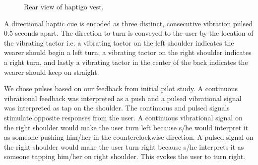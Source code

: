 \documentclass{sigchi}
\begin{document}
\begin{figure}
\centering
{}
\caption{Rear view of haptigo vest.}
\label{figure:haptigo:back}
\end{figure}

A directional haptic cue is encoded as three distinct, consecutive vibration pulsed 0.5 seconds apart. The direction to turn is conveyed to the user by the location of the vibrating tactor i.e. a vibrating tactor on the left shoulder indicates the wearer should begin a left turn, a vibrating tactor on the right shoulder indicates a right turn, and lastly a vibrating tactor in the center of the back indicates the wearer should keep on straight.

We chose pulses based on our feedback from initial pilot study. A continuous vibrational feedback was interpreted as a push and a pulsed vibrational signal was interpreted as tap on the shoulder. The continuous and pulsed signals stimulate opposite responses from the user. A continuous vibrational signal on the right shoulder would make the user turn left because s/he would interpret it as someone pushing him/her in the counterclockwise direction. A pulsed signal on the right shoulder would make the user turn right because s/he interprets it as someone tapping him/her on right shoulder. This evokes the user to turn right.
\end{document}
